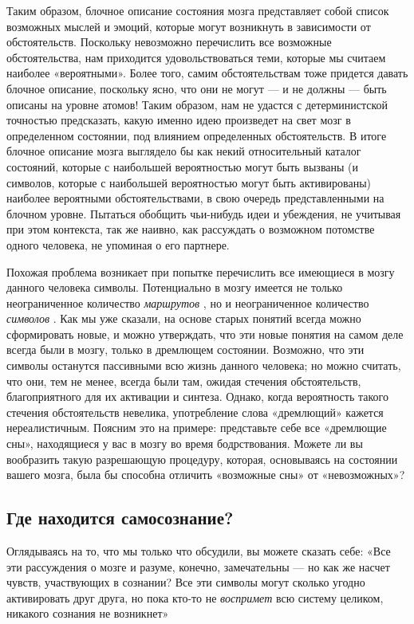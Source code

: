 \documentclass[../main.tex]{subfiles}
\begin{document}
Таким образом, блочное описание состояния мозга представляет собой список возможных мыслей и эмоций, которые могут возникнуть в зависимости от обстоятельств. Поскольку невозможно перечислить все возможные обстоятельства, нам приходится удовольствоваться теми, которые мы считаем наиболее «вероятными». Более того, самим обстоятельствам тоже придется давать блочное описание, поскольку ясно, что они не могут --- и не должны --- быть описаны на уровне атомов! Таким образом, нам не удастся с детерминистской точностью предсказать, какую именно идею произведет на свет мозг в определенном состоянии, под влиянием определенных обстоятельств. В итоге блочное описание мозга выглядело бы как некий относительный каталог состояний, которые с наибольшей вероятностью могут быть вызваны (и символов, которые с наибольшей вероятностью могут быть активированы) наиболее вероятными обстоятельствами, в свою очередь представленными на блочном уровне. Пытаться обобщить чьи-нибудь идеи и убеждения, не учитывая при этом контекста, так же наивно, как рассуждать о возможном потомстве одного человека, не упоминая о его партнере.

Похожая проблема возникает при попытке перечислить все имеющиеся в мозгу данного человека символы. Потенциально в мозгу имеется не только неограниченное количество \emph{маршрутов} , но и неограниченное количество \emph{символов} . Как мы уже сказали, на основе старых понятий всегда можно сформировать новые, и можно утверждать, что эти новые понятия на самом деле всегда были в мозгу, только в дремлющем состоянии. Возможно, что эти символы останутся пассивными всю жизнь данного человека; но можно считать, что они, тем не менее, всегда были там, ожидая стечения обстоятельств, благоприятного для их активации и синтеза. Однако, когда вероятность такого стечения обстоятельств невелика, употребление слова «дремлющий» кажется нереалистичным. Поясним это на примере: представьте себе все «дремлющие сны», находящиеся у вас в мозгу во время бодрствования. Можете ли вы вообразить такую разрешающую процедуру, которая, основываясь на состоянии вашего мозга, была бы способна отличить «возможные сны» от «невозможных»?


\subsection{Где находится самосознание?}

Оглядываясь на то, что мы только что обсудили, вы можете сказать себе: «Все эти рассуждения о мозге и разуме, конечно, замечательны --- но как же насчет чувств, участвующих в сознании? Все эти символы могут сколько угодно активировать друг друга, но пока кто-то не \emph{воспримет} всю систему целиком, никакого сознания не возникнет»
\end{document}
